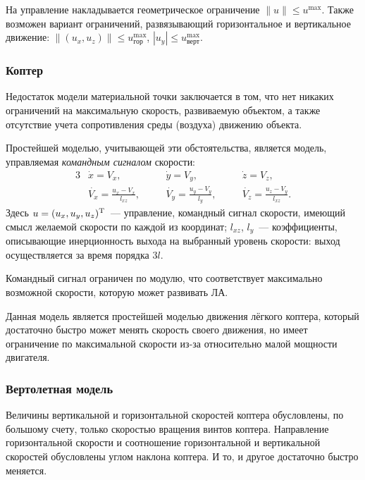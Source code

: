 \documentclass[a4paper,12pt]{article}
\begin{document}
На управление накладывается геометрическое ограничение $\|u\| \leqslant u^{\max}$. Также возможен вариант ограничений, развязывающий горизонтальное и вертикальное движение: $\big\|(u_x,u_z)\big\| \leqslant u^{\max}_\text{гор}$, $|u_y| \leqslant u^{\max}_\text{верт}$.


\subsubsection{Коптер}  

Недостаток модели материальной точки заключается в том, что нет никаких ограничений на максимальную скорость, развиваемую объектом, а также отсутствие учета сопротивления среды (воздуха) движению объекта.

Простейшей моделью, учитывающей эти обстоятельства, является модель, управляемая \textit{командным сигналом} скорости:
\begin{alignat*}{3}
  & \dot{x} = V_x, & \quad & \dot{y} = V_y, & \quad
    & \dot{z} = V_z, \\
  & \displaystyle
    \dot{V_x} = \frac{u_x - V_x}{l_{xz}},  & &
    \dot{V_y} = \frac{u_y - V_y}{l_{y}},   & &
    \dot{V_z} = \frac{u_z - V_y}{l_{xz}}.
\end{alignat*}
Здесь $u = (u_x, u_y, u_z)^\text{\textup{T}}$~--- управление, командный сигнал скорости, имеющий смысл желаемой скорости по каждой из координат; $l_{xz}$, $l_y$~--- коэффициенты, описывающие инерционность выхода на выбранный уровень скорости: выход осуществляется за время порядка $3l$. 

Командный сигнал ограничен по модулю, что соответствует максимально возможной скорости, которую может развивать ЛА. 

Данная модель является простейшей моделью движения лёгкого коптера, который достаточно быстро может менять скорость своего движения, но имеет ограничение по максимальной скорости из-за относительно малой мощности двигателя. 

\subsubsection{Вертолетная модель}

Величины вертикальной и горизонтальной скоростей коптера обусловлены, по большому счету, только скоростью вращения винтов коптера. Направление горизонтальной скорости и соотношение горизонтальной и вертикальной скоростей обусловлены углом наклона коптера. И то, и другое достаточно быстро меняется.
\end{document}
